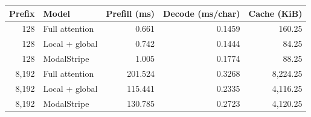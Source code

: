 \begin{tabular}{rlrrr}\toprule
Prefix & Model & Prefill (ms) & Decode (ms/char) & Cache (KiB)\\\midrule
128 & Full attention & 0.661 & 0.1459 & 160.25 \\
128 & Local + global & 0.742 & 0.1444 & 84.25 \\
128 & ModalStripe & 1.005 & 0.1774 & 88.25 \\
8,192 & Full attention & 201.524 & 0.3268 & 8,224.25 \\
8,192 & Local + global & 115.441 & 0.2335 & 4,116.25 \\
8,192 & ModalStripe & 130.785 & 0.2723 & 4,120.25 \\
\bottomrule\end{tabular}
